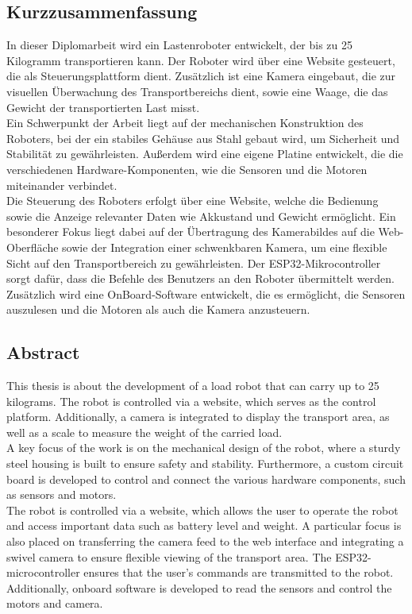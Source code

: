 \documentclass[ngerman,12pt,a4paper]{article}
\begin{document}
	\subsection{Kurzzusammenfassung}
	In dieser Diplomarbeit wird ein Lastenroboter entwickelt, der bis zu 25 Kilogramm transportieren kann. Der Roboter wird über eine Website gesteuert, die als Steuerungsplattform dient. Zusätzlich ist eine Kamera eingebaut, die zur visuellen Überwachung des Transportbereichs dient, sowie eine Waage, die das Gewicht der transportierten Last misst.\\[0.5 cm]
	Ein Schwerpunkt der Arbeit liegt auf der mechanischen Konstruktion des Roboters, bei der ein stabiles Gehäuse aus Stahl gebaut wird, um Sicherheit und Stabilität zu gewährleisten. Außerdem wird eine eigene Platine entwickelt, die die verschiedenen Hardware-Komponenten, wie die Sensoren und die Motoren miteinander verbindet.\\[0.5 cm]
	Die Steuerung des Roboters erfolgt über eine Website, welche die Bedienung sowie die Anzeige relevanter Daten wie Akkustand und Gewicht ermöglicht. Ein besonderer Fokus liegt dabei auf der Übertragung des Kamerabildes auf die Web-Oberfläche sowie der Integration einer schwenkbaren Kamera, um eine flexible Sicht auf den Transportbereich zu gewährleisten. Der ESP32-Mikrocontroller sorgt dafür, dass die Befehle des Benutzers an den Roboter übermittelt werden.\\[0.5 cm]
	Zusätzlich wird eine OnBoard-Software entwickelt, die es ermöglicht, die Sensoren auszulesen und die Motoren als auch die Kamera anzusteuern.\\[0.5 cm]
	
	\newpage
	
	\subsection{Abstract}
	
	This thesis is about the development of a load robot that can carry up to 25 kilograms. The robot is controlled via a website, which serves as the control platform. Additionally, a camera is integrated to display the transport area, as well as a scale to measure the weight of the carried load.\\[0.5 cm]
	A key focus of the work is on the mechanical design of the robot, where a sturdy steel housing is built to ensure safety and stability. Furthermore, a custom circuit board is developed to control and connect the various hardware components, such as sensors and motors.\\[0.5 cm]
	The robot is controlled via a website, which allows the user to operate the robot and access important data such as battery level and weight. A particular focus is also placed on transferring the camera feed to the web interface and integrating a swivel camera to ensure flexible viewing of the transport area. The ESP32-microcontroller ensures that the user's commands are transmitted to the robot.\\[0.5 cm]
	Additionally, onboard software is developed to read the sensors and control the motors and camera.
	\thispagestyle{fancy}
	\newpage
\end{document}
